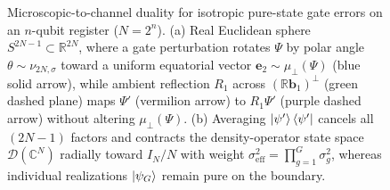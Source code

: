 \begin{figure}[t]
\caption{Microscopic-to-channel duality for isotropic pure-state gate errors on an $n$-qubit register ($N = 2^n$). (a) Real Euclidean sphere $S^{2N-1} \subset \mathbb{R}^{2N}$, where a gate perturbation rotates $\Psi$ by polar angle $\theta \sim \nu_{2N,\sigma}$ toward a uniform equatorial vector $\mathbf{e}_2 \sim \mu_\perp(\Psi)$ (blue solid arrow), while ambient reflection $R_1$ across $(\mathbb{R}\mathbf{b}_1)^\perp$ (green dashed plane) maps $\Psi'$ (vermilion arrow) to $R_1\Psi'$ (purple dashed arrow) without altering $\mu_\perp(\Psi)$. (b) Averaging $\ket{\psi'}\bra{\psi'}$ cancels all $(2N - 1)$ factors and contracts the density-operator state space $\mathcal{D}(\mathbb{C}^N)$ radially toward $I_N/N$ with weight $\sigma_{\mathrm{eff}}^2 = \prod_{g=1}^G \sigma_g^2$, whereas individual realizations $\ket{\psi_G}$ remain pure on the boundary.}
\label{fig:sphere-duality}
\end{figure}
